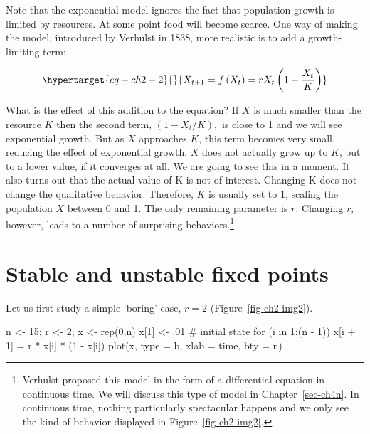 \documentclass[
  a4paper,
  DIV=11,
  numbers=noendperiod,
  oneside]{scrreprt}
\newenvironment{Shaded}{\begin{snugshade}}{\end{snugshade}}
\newcommand{\AttributeTok}[1]{\textcolor[rgb]{0.40,0.45,0.13}{#1}}
\newcommand{\CommentTok}[1]{\textcolor[rgb]{0.37,0.37,0.37}{#1}}
\newcommand{\ControlFlowTok}[1]{\textcolor[rgb]{0.00,0.23,0.31}{#1}}
\newcommand{\DecValTok}[1]{\textcolor[rgb]{0.68,0.00,0.00}{#1}}
\newcommand{\FunctionTok}[1]{\textcolor[rgb]{0.28,0.35,0.67}{#1}}
\newcommand{\NormalTok}[1]{\textcolor[rgb]{0.00,0.23,0.31}{#1}}
\newcommand{\OtherTok}[1]{\textcolor[rgb]{0.00,0.23,0.31}{#1}}
\newcommand{\SpecialCharTok}[1]{\textcolor[rgb]{0.37,0.37,0.37}{#1}}
\newcommand{\StringTok}[1]{\textcolor[rgb]{0.13,0.47,0.30}{#1}}
\begin{document}
Note that the exponential model ignores the fact that population growth
is limited by resources. At some point food will become scarce. One way
of making the model, introduced by Verhulst in 1838, more realistic is
to add a growth-limiting term:

\begin{equation}\protect\hypertarget{eq-ch2-2}{}{
X_{t + 1} = f\left( X_{t} \right) = rX_{t}\left( 1 - \frac{X_{t}}{K} \right)}\label{eq-ch2-2}\end{equation}

What is the effect of this addition to the equation? If \(X\) is much
smaller than the resource \(K\) then the second term,
\(\left( 1 - {X_{t}}/{K} \right),\) is close to 1 and we will see
exponential growth. But as \(X\) approaches \(K\), this term becomes
very small, reducing the effect of exponential growth. \(X\) does not
actually grow up to \(K\), but to a lower value, if it converges at all.
We are going to see this in a moment. It also turns out that the actual
value of K is not of interest. Changing K does not change the
qualitative behavior. Therefore, \(K\) is usually set to 1, scaling the
population \(X\) between 0 and 1. The only remaining parameter is \(r\).
Changing \(r\), however, leads to a number of surprising
behaviors.\footnote{Verhulst proposed this model in the form of a
  differential equation in continuous time. We will discuss this type of
  model in Chapter~\ref{sec-ch4n}. In continuous time, nothing
  particularly spectacular happens and we only see the kind of behavior
  displayed in Figure~\ref{fig-ch2-img2}.}

\hypertarget{sec-Stable-and-unstable-fixed-points}{%
\section{Stable and unstable fixed
points}\label{sec-Stable-and-unstable-fixed-points}}

Let us first study a simple `boring' case, \(r = 2\)
(Figure~\ref{fig-ch2-img2}).

\begin{Shaded}
\begin{Highlighting}[]
\NormalTok{n }\OtherTok{\textless{}{-}} \DecValTok{15}\NormalTok{; r }\OtherTok{\textless{}{-}} \DecValTok{2}\NormalTok{; x }\OtherTok{\textless{}{-}} \FunctionTok{rep}\NormalTok{(}\DecValTok{0}\NormalTok{,n)}
\NormalTok{x[}\DecValTok{1}\NormalTok{] }\OtherTok{\textless{}{-}}\NormalTok{ .}\DecValTok{01} \CommentTok{\# initial state}
\ControlFlowTok{for}\NormalTok{ (i }\ControlFlowTok{in} \DecValTok{1}\SpecialCharTok{:}\NormalTok{(n }\SpecialCharTok{{-}} \DecValTok{1}\NormalTok{))}
\NormalTok{  x[i }\SpecialCharTok{+} \DecValTok{1}\NormalTok{] }\OtherTok{=}\NormalTok{ r }\SpecialCharTok{*}\NormalTok{ x[i] }\SpecialCharTok{*}\NormalTok{ (}\DecValTok{1} \SpecialCharTok{{-}}\NormalTok{ x[i])}
\FunctionTok{plot}\NormalTok{(x, }\AttributeTok{type =} \StringTok{\textquotesingle{}b\textquotesingle{}}\NormalTok{, }\AttributeTok{xlab =} \StringTok{\textquotesingle{}time\textquotesingle{}}\NormalTok{, }\AttributeTok{bty =} \StringTok{\textquotesingle{}n\textquotesingle{}}\NormalTok{)}
\end{Highlighting}
\end{Shaded}
\end{document}

